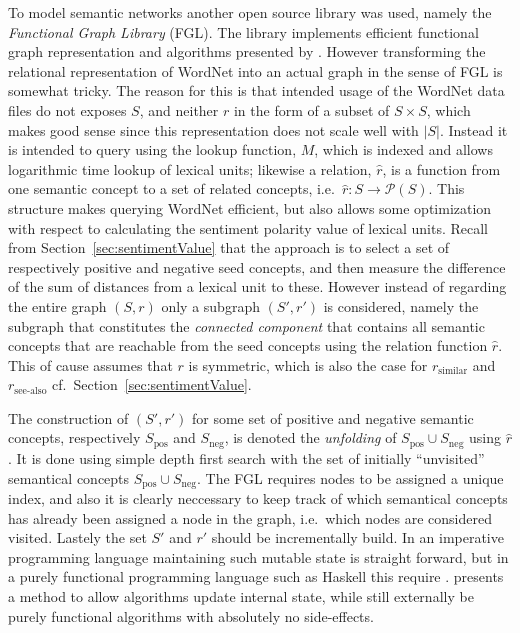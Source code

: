 To model semantic networks another open source library was used, namely the \emph{Functional Graph Library} (FGL). The library implements efficient functional graph representation and algorithms presented by \citeauthor{fgl} . However transforming the relational representation of WordNet into an actual graph in the sense of FGL is somewhat tricky. The reason for this is that intended usage of the WordNet data files do not exposes $S$, and neither $r$ in the form of a subset of $S \times S$, which makes good sense since this representation does not scale well with $|S|$. Instead it is intended to query using the lookup function, $M$, which is indexed and allows logarithmic time lookup of lexical units; likewise a relation, $\hat{r}$, is a function from one semantic concept to a set of related concepts, i.e.\ $\hat{r}: S \to \mathcal{P}(S)$. This structure makes querying WordNet efficient, but also allows some optimization with respect to calculating the sentiment polarity value of lexical units. Recall from Section~\ref{sec:sentimentValue} that the approach is to select a set of respectively positive and negative seed concepts, and then measure the difference of the sum of distances from a lexical unit to these. However instead of regarding the entire graph $(S, r)$ only a subgraph $(S', r')$ is considered, namely the subgraph that constitutes the \emph{connected component} that contains all semantic concepts that are reachable from the seed concepts using the relation function $\hat{r}$. This of cause assumes that $r$ is symmetric, which is also the case for $r_\mathrm{similar}$ and $r_\mathrm{see\text{-}also}$ cf.\ Section~\ref{sec:sentimentValue}.

The construction of $(S', r')$ for some set of positive and negative semantic concepts, respectively $S_\mathrm{pos}$ and $S_\mathrm{neg}$, is denoted the \emph{unfolding} of $S_\mathrm{pos} \cup S_\mathrm{neg}$ using $\hat{r}$. It is done using simple depth first search with the set of initially ``unvisited'' semantical concepts $S_\mathrm{pos} \cup S_\mathrm{neg}$. The FGL requires nodes to be assigned a unique index, and also it is clearly neccessary to keep track of which semantical concepts has already been assigned a node in the graph, i.e.\ which nodes are considered visited. Lastely the set $S'$ and $r'$ should be incrementally build. In an imperative programming language maintaining such mutable state is straight forward, but in a purely functional programming language such as Haskell this require  . \citeauthor{st}  presents a method to allow algorithms update internal state, while still externally be purely functional algorithms with absolutely no side-effects.

